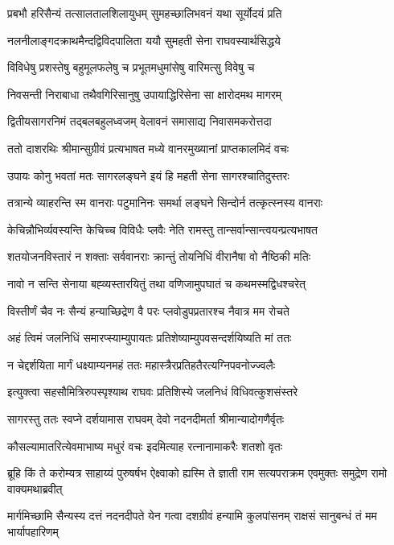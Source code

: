 \twolineshloka
{प्रबभौ हरिसैन्यं तत्सालतालशिलायुधम्}
{सुमहच्छालिभवनं यथा सूर्योदयं प्रति}


\twolineshloka
{नलनीलाङ्गदक्राथमैन्दद्विविदपालिता}
{ययौ सुमहती सेना राघवस्यार्थसिद्धये}


\twolineshloka
{विविधेषु प्रशस्तेषु बहुमूलफलेषु च}
{प्रभूतमधुमांसेषु वारिमत्सु विवेषु च}


\twolineshloka
{निवसन्ती निराबाधा तथैवगिरिसानुषु}
{उपायाद्धिरिसेना सा क्षारोदमथ मागरम्}


\twolineshloka
{द्वितीयसागरनिमं तद्बलबहुलध्वजम्}
{वेलावनं समासाद्य निवासमकरोत्तदा}


\twolineshloka
{ततो दाशरथिः श्रीमान्सुग्रीवं प्रत्यभाषत}
{मध्ये वानरमुख्यानां प्राप्तकालमिदं वचः}


\twolineshloka
{उपायः कोनु भवतां मतः सागरलङ्घने}
{इयं हि महती सेना सागरश्चातिदुस्तरः}


\twolineshloka
{तत्रान्ये व्याहरन्ति स्म वानराः पटुमानिनः}
{समर्था लङ्घने सिन्दोर्न तत्कृत्स्नस्य वानराः}


\twolineshloka
{केचिन्नौभिर्व्यवस्यन्ति केचिच्च विविधैः प्लवैः}
{नेति रामस्तु तान्सर्वान्सान्त्वयन्प्रत्यभाषत}


\twolineshloka
{शतयोजनविस्तारं न शक्ताः सर्ववानराः}
{क्रान्तुं तोयनिधिं वीरानैषा वो नैष्ठिकी मतिः}


\twolineshloka
{नावो न सन्ति सेनाया बह्व्यस्तारयितुं तथा}
{वणिजामुपघातं च कथमस्मद्विधश्चरेत्}


\twolineshloka
{विस्तीर्णं चैव नः सैन्यं हन्याच्छिद्रेण वै परः}
{प्लवोडुपप्रतारश्च नैवात्र मम रोचते}


\twolineshloka
{अहं त्विमं जलनिधिं समारप्स्याम्युपायतः}
{प्रतिशेष्याम्युपवसन्दर्शयिष्यति मां ततः}


\twolineshloka
{न चेद्दर्शयिता मार्गं धक्ष्याम्यनमहं ततः}
{महास्त्रैरप्रतिहतैरत्यग्निपवनोज्ज्वलैः}


\twolineshloka
{इत्युक्त्वा सहसौमित्रिरुपस्पृश्याथ राघवः}
{प्रतिशिस्ये जलनिधं विधिवत्कुशसंस्तरे}


\twolineshloka
{सागरस्तु ततः स्वप्ने दर्शयामास राघवम्}
{देवो नदनदीमर्ता श्रीमान्यादोगणैर्वृतः}


\twolineshloka
{कौसल्यामातरित्येवमाभाष्य मधुरं वचः}
{इदमित्याह रत्नानामाकरैः शतशो वृतः}


\threelineshloka
{ब्रूहि किं ते करोम्यत्र साहाय्यं पुरुषर्षभ}
{ऐक्ष्वाको ह्यस्मि ते ज्ञाती राम सत्यपराक्रम}
{एवमुक्तः समुद्रेण रामो वाक्यमथाब्रवीत्}


\threelineshloka
{मार्गमिच्छामि सैन्यस्य दत्तं नदनदीपते}
{येन गत्वा दशग्रीवं हन्यामि कुलपांसनम्}
{राक्षसं सानुबन्धं तं मम भार्यापहारिणम्}


